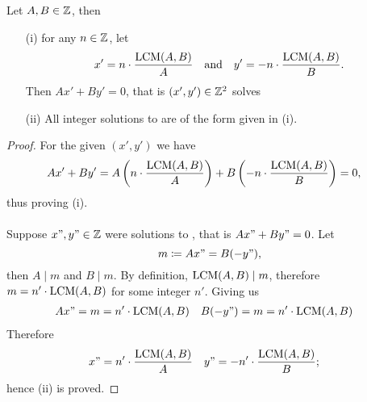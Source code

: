 \begin{proposition}\label{proposition 2.4}
Let $A,B \in \mathbb Z$, then
\begin{itemize}
\item[(i)] for any $n\in \mathbb Z$, let
\[x' = n\cdot \frac{\operatorname{LCM}(A,B)}{A} \quad\text{and}\quad y' = -n\cdot \frac{\operatorname{LCM}(A,B)}{B}.\]
Then $Ax' + By' = 0$, that is $(x',y') \in \mathbb Z^2$ solves 
\item[(ii)] All integer solutions to  are of the form given in (i).
\end{itemize}
\begin{proof}
For the given $(x',y')$ we have
\begin{align*}
Ax' + By' &= A\left(n\cdot \frac{\operatorname{LCM}(A,B)}{A}\right) + B\left(-n\cdot \frac{\operatorname{LCM}(A,B)}{B}\right) = 0,
\end{align*}
thus proving (i).\\
\\
Suppose $x",y" \in \mathbb Z$ were solutions to , that is $Ax" + By" = 0$. Let 
\[m \coloneqq Ax" = B(-y"),\]
then $A\mid m$ and $B \mid m$. By definition, $\operatorname{LCM}(A,B)\mid m$, therefore $m = n'\cdot\operatorname{LCM}(A,B)$ for some integer $n'$. Giving us
\begin{align*}
Ax" &= m = n'\cdot \operatorname{LCM}(A,B) & B(-y") &= m = n'\cdot \operatorname{LCM}(A,B)
\end{align*}
Therefore
\begin{align*}
x"&= n'\cdot\frac{\operatorname{LCM}(A,B)}{A} & y"&= -n'\cdot\frac{\operatorname{LCM}(A,B)}{B};
\end{align*}
hence (ii) is proved.
\end{proof}
\end{proposition}


